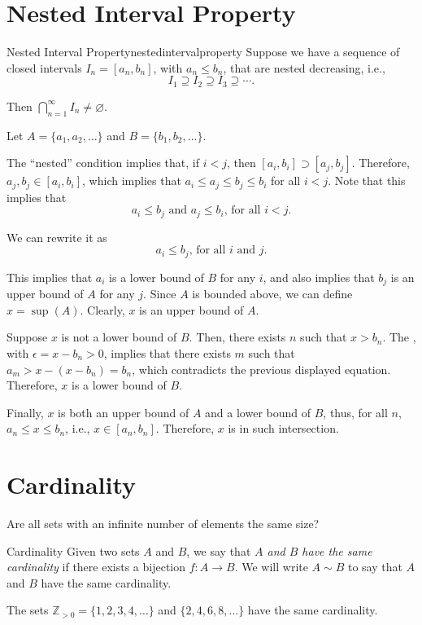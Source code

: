 
\section{Nested Interval Property}

\begin{thm}{Nested Interval Property}{nestedintervalproperty}
	Suppose we have a sequence of closed intervals \(I_n = [a_n, b_n]\), with \(a_n \leq b_n\), that are nested decreasing, i.e.,  \[
		I_1 \supseteq I_2 \supseteq I_3 \supseteq \cdots.
	\]

	Then \(\bigcap_{n=1}^\infty I_n \neq \varnothing\).
\end{thm}

\begin{dem}{}{}
	Let \(A = \{a_1, a_2, \dots\}\) and \(B = \{b_1, b_2, \dots\}\). 

	The ``nested'' condition implies that, if \(i < j\), then \([a_i, b_i] \supset [a_j, b_j]\). Therefore,  \(a_j, b_j \in [a_i, b_i]\), which implies that  \(a_i \leq a_j \leq b_j \leq b_i\) for all \(i < j\). Note that this implies that  \[
		a_i \leq b_j \text{ and } a_j \leq b_i \text{, for all }i < j.
	\]

	We can rewrite it as \[
		a_i \leq b_j\text{, for all }i\text{ and }j.
	\]

	This implies that \(a_i\) is a lower bound of \(B\) for any \(i\), and also implies that \(b_j\) is an upper bound of \(A\) for any \(j\). Since \(A\) is bounded above, we can define \(x = \sup(A)\). Clearly, \(x\) is an upper bound of \(A\).

	Suppose \(x\) is not a lower bound of \(B\). Then, there exists \(n\) such that \(x > b_n\). The , with \(\epsilon = x - b_n > 0\), implies that there exists \(m\) such that \(a_m > x - (x - b_n) = b_n\), which contradicts the previous displayed equation. Therefore, \(x\) is a lower bound of \(B\).

	Finally, \(x\) is both an upper bound of \(A\) and a lower bound of \(B\), thus, for all \(n\), \(a_n \leq x \leq b_n\), i.e.,  \(x \in [a_n, b_n]\). Therefore, \(x\) is in such intersection.
\end{dem}

\section{Cardinality}

\begin{que}{}{}
	Are all sets with an infinite number of elements the same size?
\end{que}

\begin{defn}{Cardinality}{}
Given two sets \(A\) and \(B\), we say that \emph{\(A\) and \(B\) have the same cardinality} if there exists a bijection \(f\colon A \to B\). We will write \(A \sim B\) to say that \(A\) and \(B\) have the same cardinality.
\end{defn}

\begin{exmp}{}{}
	The sets \(\mathbb{Z}_{>0} = \{1, 2, 3, 4, \dots\}\) and \(\{2, 4, 6, 8, \dots\}\) have the same cardinality.
\end{exmp}
